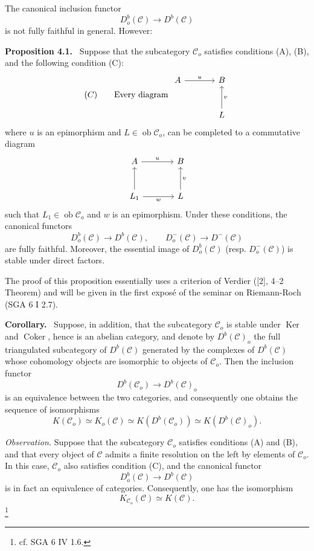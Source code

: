 \documentclass[11pt]{article}
\newenvironment{statement}[1]{\par\medskip\noindent\textbf{#1.}\ }{\par\medskip}
\providecommand{\Ker}{\operatorname{Ker}}
\providecommand{\Coker}{\operatorname{Coker}}
\providecommand{\Ob}{\operatorname{ob}}
\providecommand{\cC}{\mathcal C}
\providecommand{\Ker}{\operatorname{Ker}}
\providecommand{\Coker}{\operatorname{Coker}}
\providecommand{\Ker}{\operatorname{Ker}}
\providecommand{\Coker}{\operatorname{Coker}}
\providecommand{\Ob}{\operatorname{ob}}
\providecommand{\cC}{\mathcal C}
\providecommand{\Ob}{\operatorname{Ob}}
\providecommand{\Ob}{\operatorname{ob}}
\providecommand{\Ob}{\operatorname{Ob}}
\begin{document}
The canonical inclusion functor
\[
D_o^b(\cC)\longrightarrow D^b(\cC)
\]
is not fully faithful in general. However:

\begin{statement}{Proposition 4.1}
Suppose that the subcategory $\cC_o$ satisfies conditions (A), (B), and the following condition (C):
\[
(C)\qquad
\text{Every diagram }
\begin{tikzcd}[column sep=large,row sep=large]
A \arrow[r,"u"]&B\\
&L \arrow[u,"v"']
\end{tikzcd}
\]
where $u$ is an epimorphism and $L\in\Ob\cC_o$, can be completed to a commutative diagram
\[
\begin{tikzcd}[column sep=large,row sep=large]
A \arrow[r,"u"]&B\\
L_1 \arrow[u] \arrow[r,"w"']&L \arrow[u,"v"']
\end{tikzcd}
\]
such that $L_1\in\Ob\cC_o$ and $w$ is an epimorphism. Under these conditions, the canonical functors
\[
D_o^b(\cC)\longrightarrow D^b(\cC),\qquad
D_o^-(\cC)\longrightarrow D^-(\cC)
\]
are fully faithful. Moreover, the essential image of $D_o^b(\cC)$ (resp. $D_o^-(\cC)$) is stable under direct factors.
\end{statement}

The proof of this proposition essentially uses a criterion of Verdier ([2], 4--2 Theorem) and will be given in the first exposé of the seminar on Riemann-Roch (SGA 6 I 2.7).

\begin{statement}{Corollary}
Suppose, in addition, that the subcategory $\cC_o$ is stable under $\Ker$ and $\Coker$, hence is an abelian category, and denote by $D^b(\cC)_o$ the full triangulated subcategory of $D^b(\cC)$ generated by the complexes of $D^b(\cC)$ whose cohomology objects are isomorphic to objects of $\cC_o$. Then the inclusion functor
\[
D^b(\cC_o)\longrightarrow D^b(\cC)_o
\]
is an equivalence between the two categories, and consequently one obtains the sequence of isomorphisms
\[
K(\cC_o)\simeq K_o(\cC)\simeq K(D^b(\cC_o))\simeq K(D^b(\cC)_o).
\tag{*}
\]
\end{statement}

\emph{Observation.} Suppose that the subcategory $\cC_o$ satisfies conditions (A) and (B), and that every object of $\cC$ admits a finite resolution on the left by elements of $\cC_o$. In this case, $\cC_o$ also satisfies condition (C), and the canonical functor
\[
D_o^b(\cC)\longrightarrow D^b(\cC)
\]
is in fact an equivalence of categories. Consequently, one has the isomorphism
\[
K_{\cC_o}(\cC)\simeq K(\cC).
\]
\footnote{cf. SGA 6 IV 1.6.}
\end{document}
